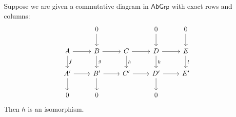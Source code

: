 \begin{proposition}
	Suppose we are given a commutative diagram in $\mathsf{AbGrp}$ with exact rows and columns:
	\begin{equation*}
		\begin{tikzcd}
			& 0\arrow[d] & & 0\arrow[d] & 0\arrow[d]\\
			A \arrow[d,"f"]\arrow[r] & B \arrow[r]\arrow[d,"g"] & C \arrow[r]\arrow[d,"h"] & D \arrow[r]\arrow[d,"k"] & E \arrow[d,"l"]\\
			A' \arrow[r]\arrow[d] & B' \arrow[r]\arrow[d] & C' \arrow[r] & D' \arrow[r]\arrow[d] & E'\\
			0 & 0 & & 0
		\end{tikzcd}
	\end{equation*}
	Then $h$ is an isomorphism.
\end{proposition}
